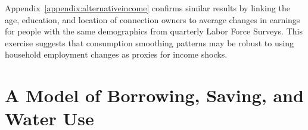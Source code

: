 \documentclass[12pt]{article}
\begin{document}
Appendix~\ref{appendix:alternativeincome} confirms similar results by linking the age, education, and location of connection owners to average changes in earnings for people with the same demographics from quarterly Labor Force Surveys.  This exercise suggests that consumption smoothing patterns may be robust to using household employment changes as proxies for income shocks.




\section{A Model of Borrowing, Saving, and Water Use}\label{section:model}


\end{document}
